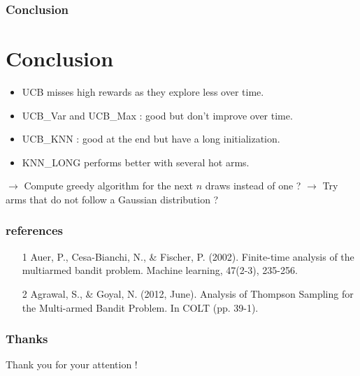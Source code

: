 \documentclass[french]{beamer}
\begin{document}
\begin{frame}
	\frametitle{Conclusion}

	\section{Conclusion}

	\begin{itemize}
		\item UCB misses high rewards as they explore less over time.

		\item UCB\_Var and UCB\_Max : good but don't improve over time.

		\item UCB\_KNN : good at the end but have a long initialization.

		\item KNN\_LONG performs better with several hot arms.
	\newline
	\end{itemize}

$\rightarrow$ Compute greedy algorithm for the next $n$ draws instead of one ?
$\rightarrow$ Try arms that do not follow a Gaussian distribution ?

\end{frame}

\begin{frame}
	\frametitle{references}


	\small{
		\begin{itemize}
		\item [1] Auer, P., Cesa-Bianchi, N., \& Fischer, P. (2002). Finite-time analysis of the multiarmed bandit problem. Machine learning, 47(2-3), 235-256.

		\item [2] Agrawal, S., \& Goyal, N. (2012, June). Analysis of Thompson Sampling for the Multi-armed Bandit Problem. In COLT (pp. 39-1).
		\end{itemize}
	}
\end{frame}

	\begin{frame}
	\frametitle{Thanks}

	Thank you for your attention !

	\end{frame}
\end{document}
